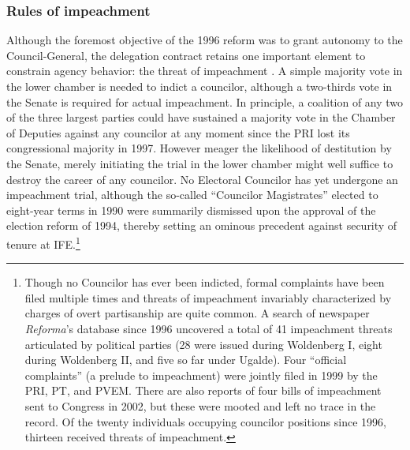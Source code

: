 \documentclass[12 pt, letter]{article}
\begin{document}
\subsubsection{Rules of impeachment}
Although the foremost objective of the 1996 reform was to grant
autonomy to the Council-General, the delegation contract retains one
important element to constrain agency behavior: the threat of
impeachment \citep{Eisenstadt2004}.  A simple majority vote in the
lower chamber is needed to indict a councilor, although a two-thirds
vote in the Senate is required for actual impeachment.  In
principle, a coalition of any two of the three largest parties could
have sustained a majority vote in the Chamber of Deputies against
any councilor at any moment since the PRI lost its congressional
majority in 1997.  However meager the likelihood of destitution by
the Senate, merely initiating the trial in the lower chamber might
well suffice to destroy the career of any councilor.  No Electoral
Councilor has yet undergone an impeachment trial, although the
so-called ``Councilor Magistrates'' elected to eight-year terms in
1990 were summarily dismissed upon the approval of the election
reform of 1994, thereby setting an ominous precedent against
security of tenure at IFE.\footnote{Though no Councilor has ever
been indicted, formal complaints have been filed multiple times and
threats of impeachment invariably characterized by charges of overt
partisanship are quite common. A search of newspaper
\emph{Reforma}'s database since 1996 uncovered a total of 41
impeachment threats articulated by political parties (28 were issued
during Woldenberg I, eight during Woldenberg II, and five so far
under Ugalde).  Four ``official complaints'' (a prelude to
impeachment) were jointly filed in 1999 by the PRI, PT, and PVEM.
There are also reports of four bills of impeachment sent to Congress
in 2002, but these were mooted and left no trace in the record.  Of
the twenty individuals occupying councilor positions since 1996,
thirteen received threats of impeachment.}
\end{document}
